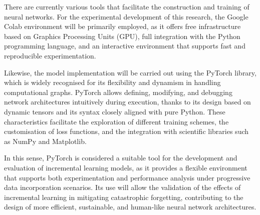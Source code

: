 There are currently various tools that facilitate the construction and training of neural networks.  
For the experimental development of this research, the Google Colab environment will be primarily employed, as it offers free infrastructure based on Graphics Processing Units (GPU), full integration with the Python programming language, and an interactive environment that supports fast and reproducible experimentation.

Likewise, the model implementation will be carried out using the PyTorch library, which is widely recognised for its flexibility and dynamism in handling computational graphs.  
PyTorch allows defining, modifying, and debugging network architectures intuitively during execution, thanks to its design based on dynamic tensors and its syntax closely aligned with pure Python.  
These characteristics facilitate the exploration of different training schemes, the customisation of loss functions, and the integration with scientific libraries such as NumPy and Matplotlib.

In this sense, PyTorch is considered a suitable tool for the development and evaluation of incremental learning models, as it provides a flexible environment that supports both experimentation and performance analysis under progressive data incorporation scenarios.  
Its use will allow the validation of the effects of incremental learning in mitigating catastrophic forgetting, contributing to the design of more efficient, sustainable, and human-like neural network architectures.
